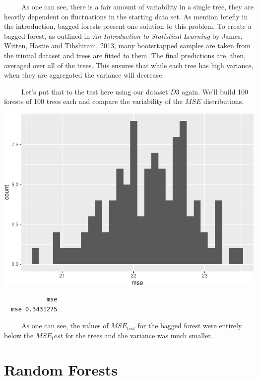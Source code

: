 \documentclass[12pt,twoside]{reedthesis}
\begin{document}
  ~~~~~As one can see, there is a fair amount of variability in a single
  tree, they are heavily dependent on fluctuations in the starting data
  set. As mention briefly in the introduction, bagged forests present one
  solution to this problem. To create a bagged forest, as outlined in
  \emph{An Introduction to Statistical Learning} by James, Witten, Hastie
  and Tibshirani, 2013, many bootsrtapped samples are taken from the
  itintial dataset and trees are fitted to them. The final predictions
  are, then, averaged over all of the trees. This ensures that while each
  tree has high variance, when they are aggregated the variance will
  decrease.
  
  ~~~~~Let's put that to the test here using our dataset \(D3\) again.
  We'll build 100 forests of 100 trees each and compare the variability of
  the \(MSE\) distributions.
  
  \begin{center}\includegraphics{Thesis_files/figure-latex/unnamed-chunk-12-1} \end{center}
  
  \begin{verbatim}
            mse
  mse 0.3431275
  \end{verbatim}
  
  ~~~~~As one can see, the values of \(MSE_{test}\) for the bagged forest
  were entirely below the \(MSE_test\) for the trees and the variance was
  much smaller.
  
  \section{Random Forests}\label{random-forests}
  
\end{document}
